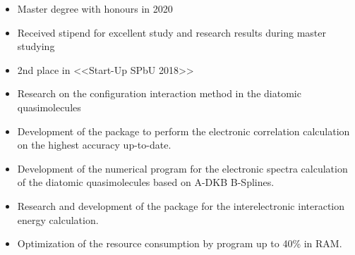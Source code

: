 \begin{itemize}
    \item Master degree with honours in 2020
    \item Received stipend for excellent study and research results during master studying
    \item 2nd place in <<Start-Up SPbU 2018>>
\end{itemize}








\vspace{0.15cm}
\begin{itemize}
    \item Research on the configuration interaction method in the diatomic quasimolecules
    \item Development of the package to perform the electronic correlation calculation on the highest accuracy up-to-date.
\end{itemize}

\begin{itemize}
    \item Development of the numerical program for the electronic spectra calculation of the diatomic quasimolecules based on A-DKB B-Splines.
    \item Research and development of the package for the interelectronic interaction energy calculation.
    \item Optimization of the resource consumption by program up to 40\% in RAM.
\end{itemize}

